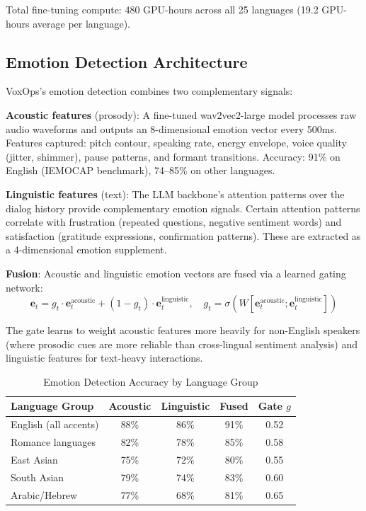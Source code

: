 \documentclass[conference,10pt]{IEEEtran}
\begin{document}
Total fine-tuning compute: 480 GPU-hours across all 25 languages (19.2 GPU-hours average per language).

\subsection{Emotion Detection Architecture}

VoxOps's emotion detection combines two complementary signals:

\textbf{Acoustic features} (prosody): A fine-tuned wav2vec2-large model processes raw audio waveforms and outputs an 8-dimensional emotion vector every 500ms. Features captured: pitch contour, speaking rate, energy envelope, voice quality (jitter, shimmer), pause patterns, and formant transitions. Accuracy: 91\% on English (IEMOCAP benchmark), 74--85\% on other languages.

\textbf{Linguistic features} (text): The LLM backbone's attention patterns over the dialog history provide complementary emotion signals. Certain attention patterns correlate with frustration (repeated questions, negative sentiment words) and satisfaction (gratitude expressions, confirmation patterns). These are extracted as a 4-dimensional emotion supplement.

\textbf{Fusion}: Acoustic and linguistic emotion vectors are fused via a learned gating network:
\begin{equation}
\mathbf{e}_t = g_t \cdot \mathbf{e}_t^{\text{acoustic}} + (1-g_t) \cdot \mathbf{e}_t^{\text{linguistic}}, \quad g_t = \sigma(W[\mathbf{e}_t^{\text{acoustic}}; \mathbf{e}_t^{\text{linguistic}}])
\end{equation}

The gate learns to weight acoustic features more heavily for non-English speakers (where prosodic cues are more reliable than cross-lingual sentiment analysis) and linguistic features for text-heavy interactions.

\begin{table}[!htbp]
\caption{Emotion Detection Accuracy by Language Group}
\label{tab:emotion_lang}
\centering\scriptsize
\begin{tabular}{@{}lcccc@{}}
\toprule
\textbf{Language Group} & \textbf{Acoustic} & \textbf{Linguistic} & \textbf{Fused} & \textbf{Gate $g$} \\
\midrule
English (all accents) & 88\% & 86\% & 91\% & 0.52 \\
Romance languages & 82\% & 78\% & 85\% & 0.58 \\
East Asian & 75\% & 72\% & 80\% & 0.55 \\
South Asian & 79\% & 74\% & 83\% & 0.60 \\
Arabic/Hebrew & 77\% & 68\% & 81\% & 0.65 \\
\bottomrule
\end{tabular}
\end{table}
\end{document}

